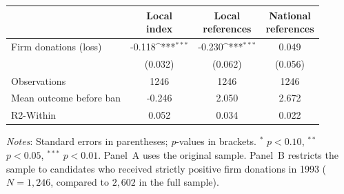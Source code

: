 \documentclass[12pt,a4paper]{article}
\begin{document}
\begin{table}[!htbp]
{
\def\sym#1{\ifmmode^{#1}\else\(^{#1}\)\fi}
\begin{tabular}{lccc}
\hline \hline
                & \shortstack{Local\\index}
                & \shortstack{Local\\references}
                & \shortstack{National\\references} \\
\hline
Firm donations (loss)
                &   -0.118\sym{***}  &   -0.230\sym{***}  &    0.049         \\
                &   (0.032)          &   (0.062)          &   (0.056)        \\
Observations    &     1246           &     1246           &     1246         \\
Mean outcome before ban
                &    -0.246          &     2.050          &     2.672        \\
R2-Within       &     0.052          &     0.034          &     0.022        \\
\hline \hline
\end{tabular}
}

\vspace{1mm}
\begin{flushleft}
\footnotesize
\justifying
\textit{Notes}: Standard errors in parentheses; \textit{p}-values in brackets. $^{*}$ \(p<0.10\), $^{**}$ \(p<0.05\), $^{***}$ \(p<0.01\).
Panel~A uses the original sample.
Panel~B restricts the sample to candidates who received strictly positive firm donations in 1993 ($N=1{,}246$, compared to $2{,}602$ in the full sample).
\end{flushleft}
\end{table}
\end{document}
